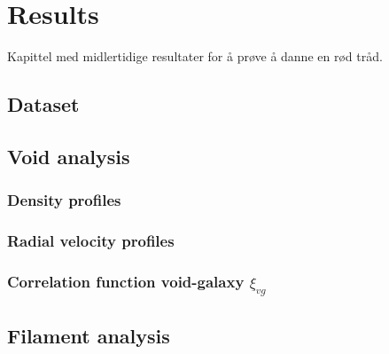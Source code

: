 \chapter{Results}
Kapittel med midlertidige resultater for å prøve å danne en rød tråd.
\section{Dataset}
\section{Void analysis}
\subsection{Density profiles}
\subsection{Radial velocity profiles}
\subsection{Correlation function void-galaxy $\xi_{vg}$}

\section{Filament analysis}
